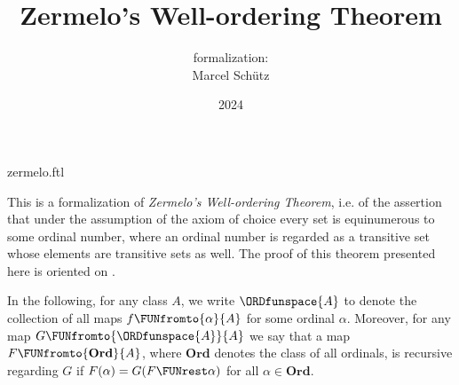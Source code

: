 \documentclass{article}
\title{Zermelo's Well-ordering Theorem}
\author{\Naproche formalization:\\[0.5em]Marcel Schütz}
\date{2024}
\newcommand\Ord{\textbf{Ord}}
\begin{document}
\begin{smodule}{zermelo.ftl}
  \maketitle
  \hidetlsnumbers


  \noindent This is a formalization of \textit{Zermelo's Well-ordering Theorem},
  i.e. of the assertion that under the assumption of the axiom of choice every
  set is equinumerous to some ordinal number, where an ordinal number is
  regarded as a transitive set whose elements are transitive sets as well.
  The proof of this theorem presented here is oriented on \cite{Koepke2018}.

  In the following, for any class $A$, we write $\ORDfunspace{A}$ to
  denote the collection of all maps $f \FUNfromto{\alpha}{A}$ for some ordinal
  $\alpha$.
  Moreover, for any map $G \FUNfromto{\ORDfunspace{A}}{A}$ we say that a map
  $F \FUNfromto{\Ord}{A}$, where $\Ord$ denotes the class of all ordinals, is
  recursive regarding $G$ if $F(\alpha) = G(F \FUNrest \alpha)$ for all
  $\alpha \in \Ord$.


  \printbibliography
\end{smodule}
\end{document}
